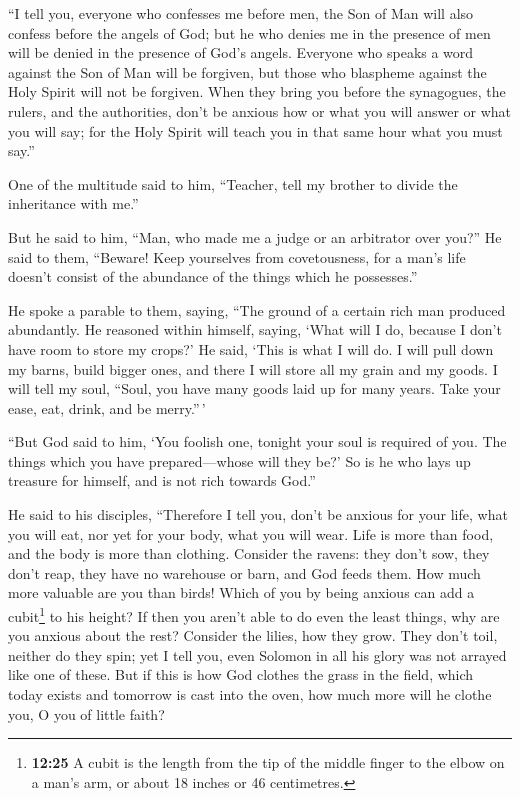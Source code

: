  ``I tell you, everyone who confesses me before men, the
Son of Man will also confess before the angels of God; 
but he who denies me in the presence of men will be denied in the
presence of God's angels.  Everyone who speaks a word
against the Son of Man will be forgiven, but those who blaspheme against
the Holy Spirit will not be forgiven.  When they bring
you before the synagogues, the rulers, and the authorities, don't be
anxious how or what you will answer or what you will say;
 for the Holy Spirit will teach you in that same hour
what you must say.''

 One of the multitude said to him, ``Teacher, tell my
brother to divide the inheritance with me.''

 But he said to him, ``Man, who made me a judge or an
arbitrator over you?''  He said to them, ``Beware! Keep
yourselves from covetousness, for a man's life doesn't consist of the
abundance of the things which he possesses.''

 He spoke a parable to them, saying, ``The ground of a
certain rich man produced abundantly.  He reasoned within
himself, saying, `What will I do, because I don't have room to store my
crops?'  He said, `This is what I will do. I will pull
down my barns, build bigger ones, and there I will store all my grain
and my goods.  I will tell my soul, ``Soul, you have many
goods laid up for many years. Take your ease, eat, drink, and be
merry.''\,'

 ``But God said to him, `You foolish one, tonight your
soul is required of you. The things which you have prepared---whose will
they be?'  So is he who lays up treasure for himself, and
is not rich towards God.''

 He said to his disciples, ``Therefore I tell you, don't
be anxious for your life, what you will eat, nor yet for your body, what
you will wear.  Life is more than food, and the body is
more than clothing.  Consider the ravens: they don't sow,
they don't reap, they have no warehouse or barn, and God feeds them. How
much more valuable are you than birds!  Which of you by
being anxious can add a cubit\footnote{\textbf{12:25} A cubit is the
  length from the tip of the middle finger to the elbow on a man's arm,
  or about 18 inches or 46 centimetres.} to his height? 
If then you aren't able to do even the least things, why are you anxious
about the rest?  Consider the lilies, how they grow. They
don't toil, neither do they spin; yet I tell you, even Solomon in all
his glory was not arrayed like one of these.  But if this
is how God clothes the grass in the field, which today exists and
tomorrow is cast into the oven, how much more will he clothe you, O you
of little faith?

